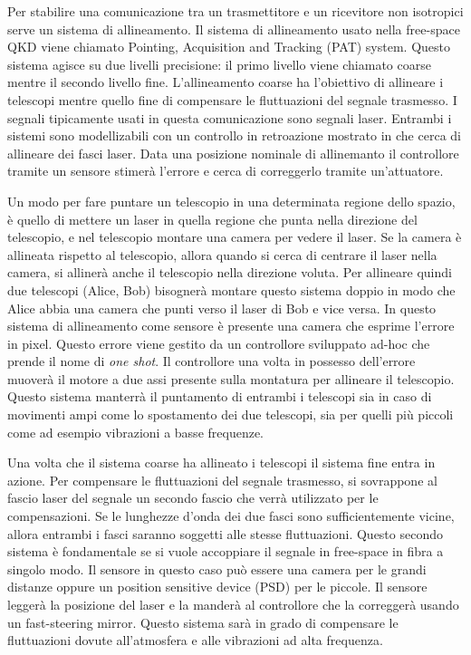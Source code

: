 Per stabilire una comunicazione tra un trasmettitore e un ricevitore non isotropici serve un sistema di allineamento. Il sistema di allineamento usato nella free-space QKD viene chiamato Pointing, Acquisition and Tracking (PAT) system. Questo sistema agisce su due livelli precisione: il primo livello viene chiamato coarse mentre il secondo livello fine. L'allineamento coarse ha l'obiettivo di allineare i telescopi mentre quello fine di compensare le fluttuazioni del segnale trasmesso. I segnali tipicamente usati in questa comunicazione sono segnali laser. Entrambi i sistemi sono modellizabili con un controllo in retroazione mostrato in  che cerca di allineare dei fasci laser. Data una posizione nominale di allinemanto il controllore tramite un sensore stimerà l'errore e cerca di correggerlo tramite un'attuatore.

Un modo per fare puntare un telescopio in una determinata regione dello spazio, è quello di mettere un laser in quella regione che punta nella direzione del telescopio, e nel telescopio montare una camera per vedere il laser. Se la camera è allineata rispetto al telescopio, allora quando si cerca di centrare il laser nella camera, si allinerà anche il telescopio nella direzione voluta. Per allineare quindi due telescopi (Alice, Bob) bisognerà montare questo sistema doppio in modo che Alice abbia una camera che punti verso il laser di Bob e vice versa.
In questo sistema di allineamento come sensore è presente una camera che esprime l'errore in pixel. Questo errore viene gestito da un controllore sviluppato ad-hoc che prende il nome di \textit{one shot}.
Il controllore una volta in possesso dell'errore muoverà il motore a due assi presente sulla montatura per allineare il telescopio.
Questo sistema manterrà il puntamento di entrambi i telescopi sia in caso di movimenti ampi come lo spostamento dei due telescopi, sia per quelli più piccoli come ad esempio vibrazioni a basse frequenze.


Una volta che il sistema coarse ha allineato i telescopi il sistema fine entra in azione. Per compensare le fluttuazioni del segnale trasmesso, si sovrappone al fascio laser del segnale un secondo fascio che verrà utilizzato per le compensazioni. Se le lunghezze d'onda dei due fasci sono sufficientemente vicine, allora entrambi i fasci saranno soggetti alle stesse fluttuazioni.
Questo secondo sistema è fondamentale se si vuole accoppiare il segnale in free-space in fibra a singolo modo. Il sensore in questo caso può essere una camera per le grandi distanze oppure un position sensitive device (PSD) per le piccole. Il sensore leggerà la posizione del laser e la manderà al controllore che la correggerà usando un fast-steering mirror. Questo sistema sarà in grado di compensare le fluttuazioni dovute all'atmosfera e alle vibrazioni ad alta frequenza.